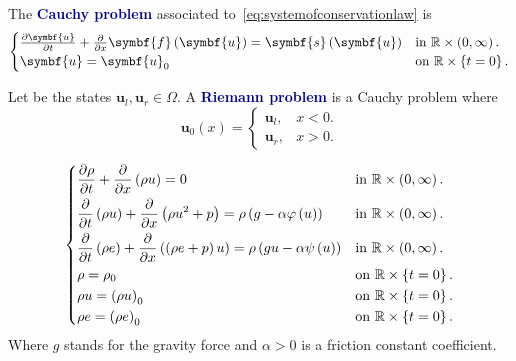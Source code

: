 \documentclass[
    8pt,
    aspectratio=1610,
    c,
    intlimits,
		handout,
    leqno,
    professionalfonts,
]{beamer}
\begin{document}
\begin{frame}
	\begin{definition}
		The \textcolor{DarkBlue}{\bfseries Cauchy problem} associated
		to~\eqref{eq:systemofconservationlaw} is
		\begin{equation}\label{eq:cauchysystemofconservationlaw}
			\begin{cases}
				\diffp{\symbf{u}}{t}+
				\diffp{}{x}
				\symbf{f}\left(\symbf{u}\right)=
				\symbf{s}\left(\symbf{u}\right) &
				\text{in }\mathbb{R}\times\left(0,\infty\right). \\
				\symbf{u}=\symbf{u}_{0}         &
				\text{on }\mathbb{R}\times\left\{t=0\right\}.
			\end{cases}
		\end{equation}
	\end{definition}
	Let be the states $\symbf{u}_{l},\symbf{u}_{r}\in\Omega$.
	A \textcolor{DarkBlue}{\bfseries Riemann problem} is a Cauchy problem where
	\begin{equation*}
		\symbf{u}_{0}\left(x\right)=
		\begin{cases}
			\symbf{u}_{l}, & x<0. \\
			\symbf{u}_{r}, & x>0.
		\end{cases}
	\end{equation*}

	\pause

	\begin{example}
		\begin{equation*}
			\begin{dcases}
				\diffp{\rho}{t}+
				\diffp{}{x}
				\left(\rho u\right)=0                                                            &
				\text{in }\mathbb{R}\times\left(0,\infty\right).                                   \\
				\diffp{}{t}
				\left(\rho u\right)+
				\diffp{}{x}
				\left(\rho u^{2}+p\right)=\rho\left(g-\alpha\varphi\left(u\right)\right)         &
				\text{in }\mathbb{R}\times\left(0,\infty\right).                                   \\
				\diffp{}{t}
				\left(\rho e\right)+
				\diffp{}{x}
				\left(\left(\rho e+p\right)u\right)=\rho\left(gu-\alpha\psi\left(u\right)\right) &
				\text{in }\mathbb{R}\times\left(0,\infty\right).                                   \\
				\rho=\rho_{0}                                                                    &
				\text{on }\mathbb{R}\times\left\{t=0\right\}.                                      \\
				\rho u={\left(\rho u\right)}_{0}                                                 &
				\text{on }\mathbb{R}\times\left\{t=0\right\}.                                      \\
				\rho e={\left(\rho e\right)}_{0}                                                 &
				\text{on }\mathbb{R}\times\left\{t=0\right\}.
			\end{dcases}
		\end{equation*}
		Where $g$ stands for the gravity force and $\alpha>0$ is a friction constant coefficient.
	\end{example}
\end{frame}
\end{document}
